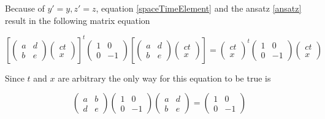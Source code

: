 \documentclass{article}
\begin{document}
Because of $y'=y, z'=z$, equation \ref{spaceTimeElement} and the ansatz \ref{ansatz} result in the following matrix equation

\begin{equation} \label{matrixEquationLorentzTransform}
\left[
\begin{pmatrix}
a & d
\\
b & e
\end{pmatrix}
\left(\begin{array}{c}
ct
\\
x
\end{array} \right)
\right]^t
\begin{pmatrix}
1 & 0
\\
0 & -1
\end{pmatrix}
\left[
\begin{pmatrix}
a & d
\\
b & e
\end{pmatrix}
\left(\begin{array}{c}
ct
\\
x
\end{array} \right)
\right]
=
\left(\begin{array}{c}
ct
\\
x
\end{array} \right)^t
\begin{pmatrix}
1 & 0
\\
0 & -1
\end{pmatrix}
\left(\begin{array}{c}
ct
\\
x
\end{array} \right)
\end{equation}

Since $t$ and $x$ are arbitrary the only way for this equation to be true is

\begin{equation} \label{minkowski}
\begin{pmatrix}
a & b
\\
d & e
\end{pmatrix}
\begin{pmatrix}
1 & 0
\\
0 & -1
\end{pmatrix}
\begin{pmatrix}
a & d
\\
b & e
\end{pmatrix}
=
\begin{pmatrix}
1 & 0
\\
0 & -1
\end{pmatrix}
\end{equation}
\end{document}

